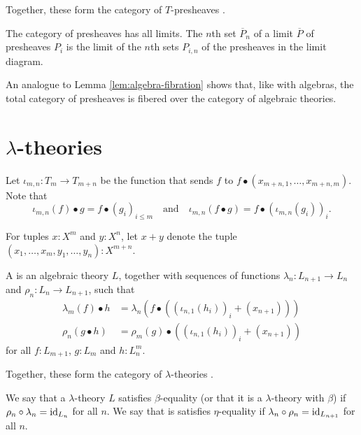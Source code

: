 Together, these form the category of $ T $-presheaves .

\begin{remark}
  The category of presheaves has all limits. The $ n $th set $ \overline{P}_n $ of a limit $ \overline{P} $ of presheaves $ P_i $ is the limit of the $ n $th sets $ P_{i, n} $ of the presheaves in the limit diagram.
\end{remark}

An analogue to Lemma \ref{lem:algebra-fibration} shows that, like with algebras, the total category of presheaves is fibered over the category of algebraic theories.

\section{\texorpdfstring{$ \lambda $-}{lambda-}theories}

Let $ \iota_{m, n} : T_m \to T_{m + n} $ be the function that sends $ f $ to $ f \bullet (x_{m + n, 1}, \dots, x_{m + n, m}) $. Note that
\[ \iota_{m, n}(f) \bullet g = f \bullet (g_i)_{i \leq m} \quad \text{and} \quad \iota_{m, n}(f \bullet g) = f \bullet (\iota_{m, n}(g_i))_i. \]

For tuples $ x : X^m $ and $ y: X^n $, let $ x + y $ denote the tuple $ (x_1, \dots, x_m, y_1, \dots, y_n) : X^{m + n} $.

\begin{definition}
  A  is an algebraic theory $ L $, together with sequences of functions $ \lambda_n: L_{n + 1} \to L_n $ and $ \rho_n: L_n \to L_{n + 1} $, such that
  \begin{align*}
    \lambda_m(f) \bullet h &= \lambda_n(f \bullet ((\iota_{n, 1}(h_i))_i + (x_{n + 1})))\\
    \rho_n(g \bullet h) &= \rho_m(g) \bullet ((\iota_{n, 1}(h_i))_i + (x_{n + 1}))
  \end{align*}
  for all $ f: L_{m + 1} $, $ g: L_m $ and $ h: L_n^m $.
\end{definition}

Together, these form the category of $ \lambda $-theories \iindex{$ \LamTh $}.

\begin{definition}
  We say that a $ \lambda $-theory $ L $ satisfies $ \beta $-equality (or that it is a $ \lambda $-theory with $ \beta $) if $ \rho_n \circ \lambda_n = \text{id}_{L_n} $ for all $ n $. We say that is satisfies $ \eta $-equality if $ \lambda_n \circ \rho_n = \text{id}_{L_{n + 1}} $ for all $ n $.
\end{definition}

